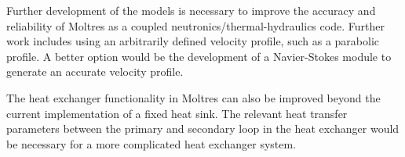 \documentclass{anstrans}
\begin{document}
	Further development of the models is necessary to improve the accuracy
	and reliability of Moltres as a coupled neutronics/thermal-hydraulics code.
	Further work includes using an arbitrarily defined velocity profile, such
	as a parabolic profile. A better option would be the development of a
	Navier-Stokes module to generate an accurate velocity profile.
	
	The heat exchanger functionality in Moltres can also be improved beyond
	the current implementation of a fixed heat sink. The relevant heat
	transfer parameters between the primary and secondary loop in the heat
	exchanger would be necessary for a more complicated heat exchanger system.



\end{document}
